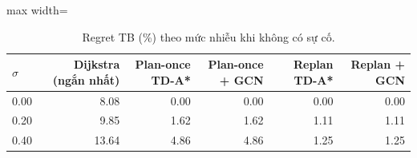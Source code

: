 \begin{table}[!htbp]
\centering
\small
\caption{Regret TB (\%) theo mức nhiễu khi không có sự cố.}
\label{tab:tab_noise_sweep}
\begin{adjustbox}{max width=\linewidth}
\begin{tabular}{lrrrrr}
\toprule
$\sigma$ & Dijkstra (ngắn nhất) & Plan-once TD-A* & Plan-once + GCN & Replan TD-A* & Replan + GCN \\
\midrule
0.00 & 8.08 & 0.00 & 0.00 & 0.00 & 0.00 \\
0.20 & 9.85 & 1.62 & 1.62 & 1.11 & 1.11 \\
0.40 & 13.64 & 4.86 & 4.86 & 1.25 & 1.25 \\
\bottomrule
\end{tabular}
\end{adjustbox}
\end{table}
